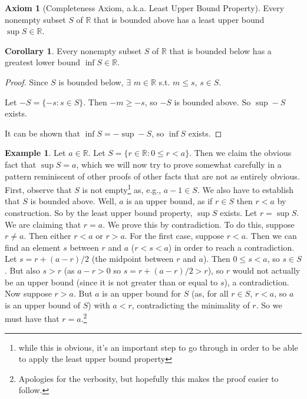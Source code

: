 \documentclass{article}
\theoremstyle{definition}
\newtheorem{example}{Example}[section]
\newtheorem{axiom}{Axiom}[section]
\newtheorem{corollary}{Corollary}[section]
\begin{document}
\begin{axiom}[Completeness Axiom, a.k.a. Least Upper Bound Property]
Every nonempty subset $S$ of $\mathbb{R}$ that is bounded above has a least upper bound $\sup S \in\mathbb{R}$.
\end{axiom}

\begin{corollary}
Every nonempty subset $S$ of $\mathbb{R}$ that is bounded below has a greatest lower bound $\inf S \in\mathbb{R}$.
\end{corollary}

\begin{proof}
Since $S$ is bounded below, $\exists$ $m \in \mathbb{R}$ s.t. $m \leq s$, $s \in S$.

Let $-S = \{ -s : s \in S \}$. Then $-m \ge -s$, so $-S$ is bounded above. So $\sup -S$ exists.

It can be shown that $\inf S = - \sup -S$, so $\inf S$ exists.

\end{proof}


\begin{example} \label{supexample}
Let $a \in \mathbb{R}$. Let $S = \{r \in \mathbb{R} : 0 \leq r < a\}$. Then we claim the obvious fact that $\sup S = a$, which we will now try to prove somewhat carefully in a pattern reminiscent of other proofs of other facts that are not as entirely obvious. First, observe that $S$ is not empty\footnote{while this is obvious, it's an important step to go through in order to be able to apply the least upper bound property} as, e.g., $a - 1 \in S$. We also have to establish that $S$ is bounded above. Well, $a$ is an upper bound, as if $r \in S$ then $r < a$ by construction. So by the least upper bound property, $\sup S$ exists. Let $r = \sup S$. We are claiming that $r = a$. We prove this by contradiction. To do this, suppose $r \neq a$. Then either $r < a$ or $r > a$. For the first case, suppose $r < a$. Then we can find an element $s$ between $r$ and $a$ ($r < s < a$) in order to reach a contradiction. Let $s = r + (a - r)/2$ (the midpoint between $r$ and $a$). Then $0 \leq s < a$, so $s \in S$. But also $s > r$ (as $a - r > 0$ so $s = r + (a - r)/2 > r$), so $r$ would not actually be an upper bound (since it is not greater than or equal to $s$), a contradiction. Now suppose $r > a$. But $a$ is an upper bound for $S$ (as, for all $r \in S$, $r < a$, so $a$ is an upper bound of $S$) with $a < r$, contradicting the minimality of $r$. So we must have that $r = a$.\footnote{Apologies for the verbosity, but hopefully this makes the proof easier to follow.}
\end{example}
\end{document}
